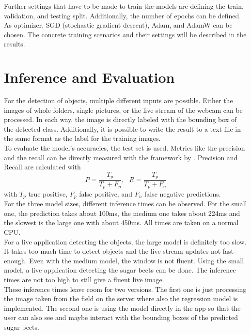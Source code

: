 Further settings that have to be made to train the models are defining the train, validation, and testing split. Additionally, the number of epochs can be defined. As optimizer, SGD (stochastic gradient descent), Adam, and AdamW can be chosen. The concrete training scenarios and their settings will be described in the results. 

\section{Inference and Evaluation}
For the detection of objects, multiple different inputs are possible. Either the images of whole folders, single pictures, or the live stream of the webcam can be processed. In each way, the image is directly labeled with the bounding box of the detected class. Additionally, it is possible to write the result to a text file in the same format as the label for the training images. \\

To evaluate the model's accuracies, the test set is used. Metrics like the precision and the recall can be directly measured with the framework by \cite{yolov5}. Precision and Recall are calculated with  
\begin{equation}
P = \frac{T_p}{T_p + F_p},\textrm{ } R = \frac{T_p}{T_p + F_n} 
\end{equation} 
with $ T_p $ true positive, $ F_p $ false positive, and $ F_n $ false negative predictions.\\

For the three model sizes, different inference times can be observed. For the small one, the prediction takes about 100ms, the medium one takes about 224ms and the slowest is the large one with about 450ms. All times are taken on a normal CPU. \\

For a live application detecting the objects, the large model is definitely too slow. It takes too much time to detect objects and the live stream updates not fast enough. Even with the medium model, the window is not fluent. Using the small model, a live application detecting the sugar beets can be done. The inference times are not too high to still give a fluent live image. \\

These inference times leave room for two versions. The first one is just processing the image taken from the field on the server where also the regression model is implemented. The second one is using the model directly in the app so that the user can also see and maybe interact with the bounding boxes of the predicted sugar beets. \\


